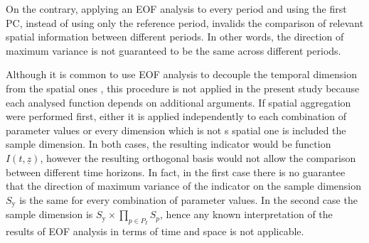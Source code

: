 On the contrary, applying an \gls{EOF} analysis to every period and using the first \gls{PC}, instead of using only the reference period, invalids the comparison of relevant spatial information between different periods. In other words, the direction of maximum variance is not guaranteed to be the same across different periods.

Although it is common to use \gls{EOF} analysis to decouple the temporal dimension from the spatial ones \cite{2007HannachiEmpiricalOrthogonal}, this procedure is not applied in the present study because each analysed function depends on additional arguments. If spatial aggregation were performed first, either it is applied independently to each combination of parameter values or every dimension which is not s spatial one is included the sample dimension. In both cases, the resulting \gls{indicator} would be function $I(t, \underline{z})$, however the resulting orthogonal basis would not allow the comparison between different time horizons. In fact, in the first case there is no guarantee that the direction of maximum variance of the indicator on the sample dimension $S_\text{y}$ is the same for every combination of parameter values. In the second case the sample dimension is $S_\text{y} \times \prod_{p \in P_I} S_p$, hence any known interpretation of the results of \gls{EOF} analysis in terms of time and space is not applicable.




